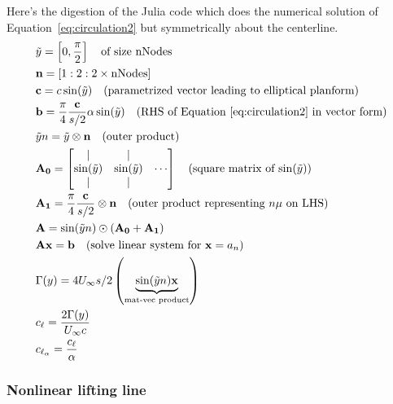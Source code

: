\documentclass[10pt]{article}
\newcommand{\mbf}[1]{\mathbf{#1}}
\newcommand{\Uinf}{U_{\infty}}
\newcommand{\tn}[1]{\textrm{#1}}
\begin{document}
Here's the digestion of the Julia code which does the numerical solution of Equation~\eqref{eq:circulation2} but symmetrically about the centerline.
\begin{align*}
	 & \tilde{y} = \left[
		0,\frac{\pi}{2}
		\right] \quad \tn{of size nNodes}
	\\
	 & \mbf{n} = \left[1:2:2\times\tn{nNodes}\right]
	\\
	 & \mbf{c} = c  \sin(\tilde{y}) \quad \tn{(parametrized vector leading to elliptical planform)}
	\\
	 & \mbf{b} = \frac{\pi}{4} \frac{\mbf{c}}{s/2} \alpha \sin(\tilde{y}) \quad \tn{(RHS of Equation~\eqref{eq:circulation2} in vector form)}
	\\
	 & \tilde{y}n = \tilde{y} \otimes \mbf{n} \quad \tn{(outer product)}
	\\
	 & \mbf{A_0} = \begin{bmatrix}
		               |               & |                        \\
		               \sin(\tilde{y}) & \sin(\tilde{y}) & \cdots \\
		               |               & |
	               \end{bmatrix} \quad \tn{(square matrix of $\sin(\tilde{y})$)}
	\\
	 & \mbf{A_1} = \frac{\pi}{4} \frac{\mbf{c}}{s/2} \otimes \mbf{n} \quad \tn{(outer product representing $n\mu$ on LHS)}
	\\
	 & \mbf{A} = \sin(\tilde{y} n ) \odot \left( \mbf{A_0}+\mbf{A_1} \right)                                                                  \\
	 & \mbf{A}\mbf{x} = \mbf{b} \quad \tn{(solve linear system for $\mbf{x} = a_n$)}                                                          \\
	 & \Gamma(y) = 4 \Uinf s/2 \left(\underbrace{\sin(\tilde{y}n)\mbf{x} }_{\tn{mat-vec product}} \right)                                     \\
	 & c_\ell = \frac{2\Gamma(y)}{\Uinf {c}}                                                                                                  \\
	 & c_{\ell_{\alpha}} = \frac{c_\ell}{\alpha}
\end{align*}

\subsubsection{Nonlinear lifting line}
\end{document}
